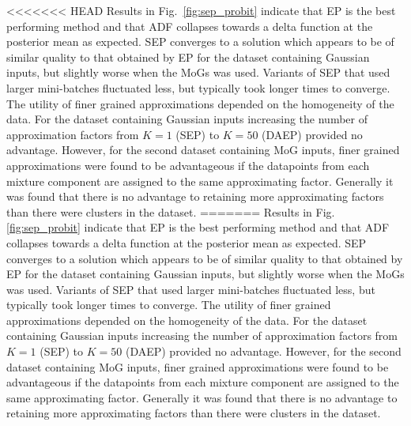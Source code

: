 
<<<<<<< HEAD
Results in Fig.~\ref{fig:sep_probit} indicate that EP is the best performing method and that ADF collapses towards a delta function at the posterior mean as expected. SEP converges to a solution which appears to be of similar quality to that obtained by EP for the dataset containing Gaussian inputs, but slightly worse when the MoGs was used. Variants of SEP that used larger mini-batches fluctuated less, but typically took longer times to converge. The utility of finer grained approximations depended on the homogeneity of the data. For the dataset containing Gaussian inputs increasing the number of approximation factors from $K=1$ (SEP) to $K=50$ (DAEP) provided no advantage. However, for the second dataset containing MoG inputs, finer grained approximations were found to be advantageous if the datapoints from each mixture component are assigned to the same approximating factor. Generally it was found that there is no advantage to retaining more approximating factors than there were clusters in the dataset.  
=======
Results in Fig. \ref{fig:sep_probit} indicate that EP is the best performing method and that ADF collapses towards a delta function at the posterior mean as expected. SEP converges to a solution which appears to be of similar quality to that obtained by EP for the dataset containing Gaussian inputs, but slightly worse when the MoGs was used. Variants of SEP that used larger mini-batches fluctuated less, but typically took longer times to converge.%
The utility of finer grained approximations depended on the homogeneity of the data. For the dataset containing Gaussian inputs increasing the number of approximation factors from $K=1$ (SEP) to $K=50$ (DAEP) provided no advantage. However, for the second dataset containing MoG inputs, finer grained approximations were found to be advantageous if the datapoints from each mixture component are assigned to the same approximating factor. Generally it was found that there is no advantage to retaining more approximating factors than there were clusters in the dataset.  


